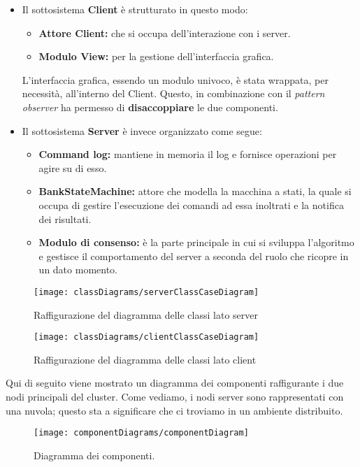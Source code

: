\begin{itemize}
	\item Il sottosistema \textbf{Client} è strutturato in questo modo: 
		\begin{itemize}
			\item{\textbf{Attore Client:}} che si occupa dell'interazione con i server.
			\item{\textbf{Modulo View:}} per la gestione dell'interfaccia grafica.  
		\end{itemize}
	L'interfaccia grafica, essendo un modulo univoco, è stata wrappata, per necessità, all'interno del Client. Questo, in combinazione con il \textit{pattern observer} ha permesso di \textbf{disaccoppiare} le due componenti.




	\item Il sottosistema \textbf{Server} è invece organizzato come segue:
		\begin{itemize}
			\item{\textbf{Command log:}} mantiene in memoria il log e fornisce operazioni per agire su di esso.
			\item{\textbf{BankStateMachine:}} attore che modella la macchina a stati, la quale si occupa di gestire l'esecuzione dei comandi ad essa inoltrati e la notifica dei risultati.
			\item{\textbf{Modulo di consenso:}} è la parte principale in cui si sviluppa l'algoritmo e gestisce il comportamento del server a seconda del ruolo che ricopre in un dato momento.
		\end{itemize}

\end{itemize}

\begin{figure}[H]
  \centering
  \texttt{[image: classDiagrams/serverClassCaseDiagram]}
  \caption[classDiagramCaption]{Raffigurazione del diagramma delle classi lato server}
  
  \label{fig:figure27}
\end{figure}

\begin{figure}[H]
  \centering
  \texttt{[image: classDiagrams/clientClassCaseDiagram]}
  \caption[classDiagramCaption]{Raffigurazione del diagramma delle classi lato client}
  
  \label{fig:figure29}
\end{figure}

Qui di seguito viene mostrato un diagramma dei componenti raffigurante i due nodi principali del cluster. Come vediamo, i nodi server sono rappresentati con una nuvola; questo sta a significare che ci troviamo in un ambiente distribuito.
\begin{figure}[H]
  \centering
  \texttt{[image: componentDiagrams/componentDiagram]}
  \caption[componentDiagramCaption]{Diagramma dei componenti.}  
  \label{fig:figure30}
\end{figure}

